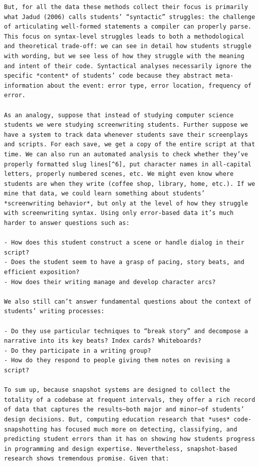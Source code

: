 \begin{verbatim}
But, for all the data these methods collect their focus is primarily what Jadud (2006) calls students’ “syntactic” struggles: the challenge of articulating well-formed statements a compiler can properly parse. This focus on syntax-level struggles leads to both a methodological and theoretical trade-off: we can see in detail how students struggle with wording, but we see less of how they struggle with the meaning and intent of their code. Syntactical analyses necessarily ignore the specific *content* of students’ code because they abstract meta-information about the event: error type, error location, frequency of error.

As an analogy, suppose that instead of studying computer science students we were studying screenwriting students. Further suppose we have a system to track data whenever students save their screenplays and scripts. For each save, we get a copy of the entire script at that time. We can also run an automated analysis to check whether they’ve properly formatted slug lines[^6], put character names in all-capital letters, properly numbered scenes, etc. We might even know where students are when they write (coffee shop, library, home, etc.). If we mine that data, we could learn something about students’ *screenwriting behavior*, but only at the level of how they struggle with screenwriting syntax. Using only error-based data it’s much harder to answer questions such as:

- How does this student construct a scene or handle dialog in their script?
- Does the student seem to have a grasp of pacing, story beats, and efficient exposition?
- How does their writing manage and develop character arcs?

We also still can’t answer fundamental questions about the context of students’ writing processes:

- Do they use particular techniques to “break story” and decompose a narrative into its key beats? Index cards? Whiteboards?
- Do they participate in a writing group?
- How do they respond to people giving them notes on revising a script?

To sum up, because snapshot systems are designed to collect the totality of a codebase at frequent intervals, they offer a rich record of data that captures the results—both major and minor—of students’ design decisions. But, computing education research that *uses* code-snapshotting has focused much more on detecting, classifying, and predicting student errors than it has on showing how students progress in programming and design expertise. Nevertheless, snapshot-based research shows tremendous promise. Given that:


\end{verbatim}
